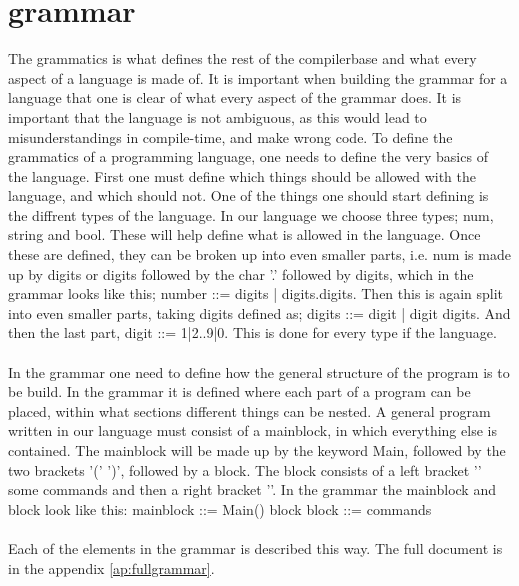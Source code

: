 \section{grammar}
The grammatics is what defines the rest of the compilerbase and what every aspect of a language is made of.
It is important when building the grammar for a language that one is clear of what every aspect of the grammar does. It is important that the language is not ambiguous, as this would lead to misunderstandings in compile-time, and make wrong code.
To define the grammatics of a programming language, one needs to define the very basics of the language. First one must define which things should be allowed with the language, and which should not.
One of the things one should start defining is the diffrent types of the language. In our language we choose three types; num, string and bool. These will help define what is allowed in the language. Once these are defined, they can be broken up into even smaller parts, i.e. num is made up by digits or digits followed by the char '.' followed by digits, which in the grammar looks like this; number ::= digits | digits.digits.
Then this is again split into even smaller parts, taking digits defined as; digits ::= digit | digit digits. And then the last part, digit ::= 1|2..9|0. This is done for every type if the language.\\
\\
In the grammar one need to define how the general structure of the program is to be build. In the grammar it is defined where each part of a program can be placed, within what sections different things can be nested. A general program written in our language must consist of a mainblock, in which everything else is contained. The mainblock will be made up by the keyword Main, followed by the two brackets '(' ')', followed by a block.
The block consists of a left bracket '{' some commands and then a right bracket '}'. In the grammar the mainblock and block look like this: mainblock ::= Main() block
block ::= { commands }\\
\\
Each of the elements in the grammar is described this way. The full document is in the appendix \ref{ap:fullgrammar}.